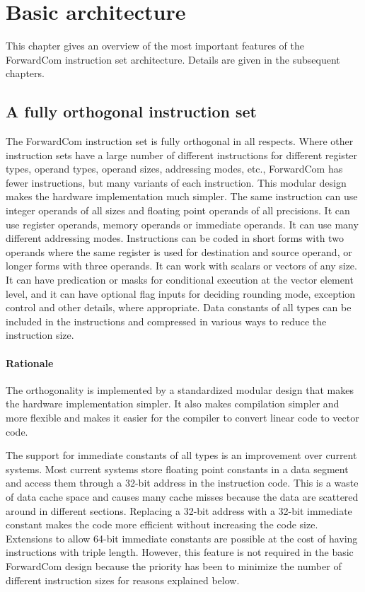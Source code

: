 \documentclass[forwardcom.tex]{subfiles}
\begin{document}
\RaggedRight

\chapter{Basic architecture}

This chapter gives an overview of the most important features of the ForwardCom instruction set architecture. Details are given in the subsequent chapters.

\section{A fully orthogonal instruction set}
The ForwardCom instruction set is fully orthogonal in all respects. 
Where other instruction sets have a large number of different instructions for different register types, operand types, operand sizes, addressing modes, etc., ForwardCom has fewer instructions, but many variants of each instruction. This modular design makes the hardware implementation much simpler.
The same instruction can use integer operands of all sizes and floating point operands of all precisions. It can use register operands, memory operands or immediate operands. It can use many different addressing modes. Instructions can be coded in short forms with two operands where the same register is used for destination and source operand, or longer forms with three operands. It can work with scalars or vectors of any size. It can have predication or masks for conditional execution at the vector element level, and it can have optional flag inputs for deciding rounding mode, exception control and other details, where appropriate. Data constants of all types can be included in the instructions and compressed in various ways to reduce the instruction size.

\subsubsection{Rationale}
The orthogonality is implemented by a standardized modular design that makes the hardware implementation simpler. It also makes compilation simpler and more flexible and makes it easier for the compiler to convert linear code to vector code.
\vspace{2mm}

The support for immediate constants of all types is an improvement over current systems. Most current systems store floating point constants in a data segment and access them through a 32-bit address in the instruction code. This is a waste of data cache space and causes many cache misses because the data are scattered around in different sections. Replacing a 32-bit address with a 32-bit immediate constant makes the code more efficient without increasing the code size. Extensions to allow 64-bit immediate constants are possible at the cost of having instructions with triple length. However, this feature is not required in the basic ForwardCom design because the priority has been to minimize the number of different instruction sizes for reasons explained below.
\end{document}
